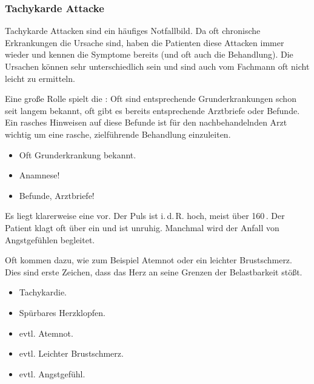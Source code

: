 \subsubsection{Tachykarde Attacke}



{%
Tachykarde Attacken sind ein häufiges Notfallbild. Da oft chronische
Erkrankungen die Ursache sind, haben die Patienten diese
Attacken immer wieder und kennen die Symptome bereits (und oft auch die Behandlung). Die
Ursachen können sehr unterschiedlich sein und sind auch vom Fachmann oft nicht
leicht zu ermitteln. 

Eine große Rolle spielt die : Oft sind entsprechende
Grunderkrankungen schon seit langem bekannt, oft gibt es bereits entsprechende Arztbriefe oder
Befunde. Ein rasches Hinweisen auf diese Befunde ist für den nachbehandelnden
Arzt wichtig um eine rasche, zielführende Behandlung einzuleiten.
}{
\begin{itemize}
  \item Oft Grunderkrankung bekannt.
  \item Anamnese!
  \item Befunde, Arztbriefe!
\end{itemize}
}{}{}{}

{Es liegt klarerweise eine  vor. Der Puls
ist i.\,d.\,R. hoch, meist über 160\,. Der Patient klagt oft über ein
 und ist unruhig. Manchmal wird der Anfall von
Angstgefühlen begleitet.

Oft kommen  dazu, wie zum Beispiel Atemnot oder ein leichter
Brustschmerz. Dies sind erste Zeichen, dass das Herz an
seine Grenzen der Belastbarkeit stößt.
}{
\begin{itemize}
  \item Tachykardie.
  \item Spürbares Herzklopfen.
  \item evtl. Atemnot.
  \item evtl. Leichter Brustschmerz.
  \item evtl. Angstgefühl.
\end{itemize}
}{}{}{}

